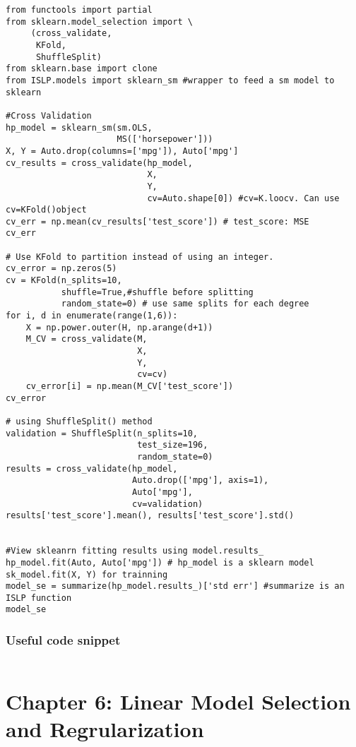 \documentclass[
  letterpaper,
  DIV=11,
  numbers=noendperiod]{scrreprt}
\begin{document}
\begin{verbatim}
from functools import partial
from sklearn.model_selection import \
     (cross_validate,
      KFold,
      ShuffleSplit)
from sklearn.base import clone
from ISLP.models import sklearn_sm #wrapper to feed a sm model to sklearn

#Cross Validation
hp_model = sklearn_sm(sm.OLS,
                      MS(['horsepower']))
X, Y = Auto.drop(columns=['mpg']), Auto['mpg']
cv_results = cross_validate(hp_model,
                            X,
                            Y,
                            cv=Auto.shape[0]) #cv=K.loocv. Can use cv=KFold()object
cv_err = np.mean(cv_results['test_score']) # test_score: MSE
cv_err

# Use KFold to partition instead of using an integer. 
cv_error = np.zeros(5)
cv = KFold(n_splits=10,
           shuffle=True,#shuffle before splitting
           random_state=0) # use same splits for each degree
for i, d in enumerate(range(1,6)):
    X = np.power.outer(H, np.arange(d+1))
    M_CV = cross_validate(M,
                          X,
                          Y,
                          cv=cv)
    cv_error[i] = np.mean(M_CV['test_score'])
cv_error

# using ShuffleSplit() method 
validation = ShuffleSplit(n_splits=10,
                          test_size=196,
                          random_state=0)
results = cross_validate(hp_model,
                         Auto.drop(['mpg'], axis=1),
                         Auto['mpg'],
                         cv=validation)
results['test_score'].mean(), results['test_score'].std()


#View skleanrn fitting results using model.results_
hp_model.fit(Auto, Auto['mpg']) # hp_model is a sklearn model sk_model.fit(X, Y) for trainning
model_se = summarize(hp_model.results_)['std err'] #summarize is an ISLP function
model_se
\end{verbatim}

\subsection{Useful code snippet}\label{useful-code-snippet-1}

\begin{verbatim}

\end{verbatim}


\chapter{Chapter 6: Linear Model Selection and
Regrularization}\label{chapter-6-linear-model-selection-and-regrularization}
\end{document}
